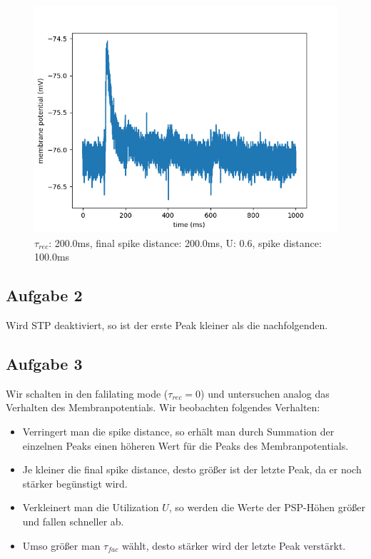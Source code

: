 \documentclass[10pt,a4paper]{scrartcl}
\begin{document}
\newpage

\begin{figure} [ht]
\begin{center}
\label{fig:abb22}
\caption{$\tau_{rec}$: 200.0ms, final spike distance: 200.0ms, U: 0.6, spike distance: 100.0ms}
\includegraphics[scale=0.35]{pictures/final_spike_variation_11.pdf} 
\end{center}
\end{figure}


\subsection{Aufgabe 2}
Wird STP deaktiviert, so ist der erste Peak kleiner als die nachfolgenden.


\subsection{Aufgabe 3}
Wir schalten in den falilating mode ($\tau_{rec} = 0$) und untersuchen analog das Verhalten des Membranpotentials. Wir beobachten folgendes Verhalten:
\begin{itemize}
\item Verringert man die spike distance, so erhält man durch Summation der einzelnen Peaks einen höheren Wert für die Peaks des Membranpotentials.
\item Je kleiner die final spike distance, desto größer ist der letzte Peak, da er noch stärker begünstigt wird.
\item Verkleinert man die Utilization $U$, so werden die Werte der PSP-Höhen größer und fallen schneller ab.
\item Umso größer man $\tau_{fac}$ wählt, desto stärker wird der letzte Peak verstärkt.
\end{itemize} 
\end{document}
